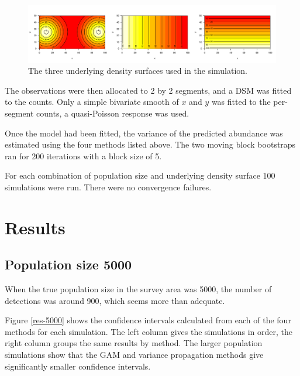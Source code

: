 \documentclass[11pt]{amsart}
\begin{document}
\begin{figure}[htbp]
\begin{center}
\includegraphics[width=\textwidth]{sim-plots}
\caption{The three underlying density surfaces used in the simulation.}
\label{sim-plots}
\end{center}
\end{figure}

The observations were then allocated to 2 by 2 segments, and a DSM was fitted to the counts. Only a simple bivariate smooth of $x$ and $y$ was fitted to the per-segment counts, a  quasi-Poisson response was used.

Once the model had been fitted, the variance of the predicted abundance was estimated using the four methods listed above. The two moving block bootstraps ran for 200 iterations with a block size of 5.

For each combination of population size and underlying density surface 100 simulations were run. There were no convergence failures.

\section{Results}

\subsection{Population size 5000}

When the true population size in the survey area was 5000, the number of detections was around 900, which seems more than adequate. 

Figure \ref{res-5000} shows the confidence intervals calculated from each of the four methods for each simulation. The left column gives the simulations in order, the right column groups the same results by method. The larger population simulations show that the GAM and variance propagation methods give significantly smaller confidence intervals. 
\end{document}
